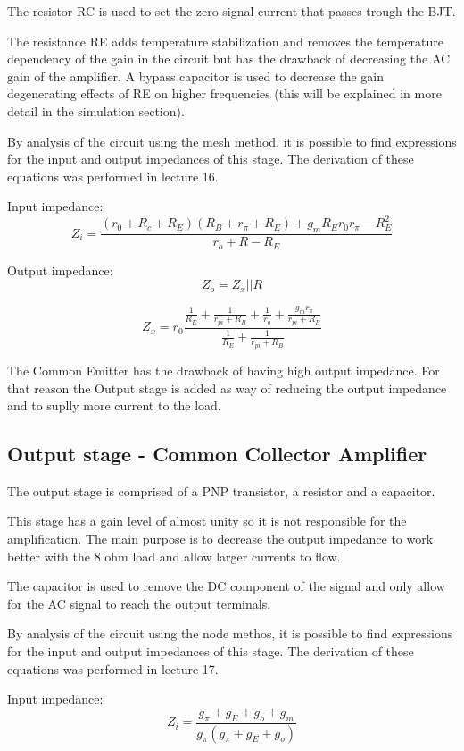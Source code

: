 The resistor RC is used to set the zero signal current that passes trough the BJT.

The resistance RE adds temperature stabilization and removes the temperature dependency of the gain in the circuit but has the drawback of decreasing the AC gain of the amplifier. A bypass capacitor is used to decrease the gain degenerating effects of RE on higher frequencies (this will be explained in more detail in the simulation section).



By analysis of the circuit using the mesh method, it is possible to find expressions for the input and output impedances of this stage. The derivation of these equations was performed in lecture 16.


Input impedance:
\[
Z_i=\frac{(r_0+R_c+R_E)(R_B+r_{\pi}+R_E) + g_mR_Er_0r_{\pi}-R_E^2}{r_o + R - R_E}
\]


Output impedance:
\[
Z_o=Z_x||R
\]

\[
Z_x=r_0\frac{\frac{1}{R_E}+\frac{1}{r_{pi}+R_B}+\frac{1}{r_o}+\frac{g_mr_{\pi}}{r_{pi}+R_B}}{\frac{1}{R_E}+\frac{1}{r_{pi}+R_B}}
\]

The Common Emitter has the drawback of having high output impedance. For that reason the Output stage is added as way of reducing the output impedance and to suplly more current to the load.

\subsection{Output stage - Common Collector Amplifier}
\label{subsec:envdet}

The output stage is comprised of a PNP transistor, a resistor and a capacitor.


This stage has a gain level of almost unity so it is not responsible for the amplification. The main purpose is to decrease the output impedance to work better with the 8 ohm load and allow larger currents to flow.


The capacitor is used to remove the DC component of the signal and only allow for the AC signal to reach the output terminals.


By analysis of the circuit using the node methos, it is possible to find expressions for the input and output impedances of this stage. The derivation of these equations was performed in lecture 17.


Input impedance:
\[
Z_i = \frac{g_{\pi}+g_E+g_o+g_m}{g_{\pi}(g_{\pi}+g_E+g_o)}
\]

